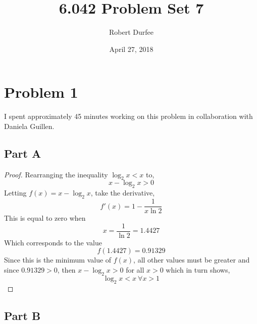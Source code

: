 \documentclass{article}
\title{6.042 Problem Set 7}
\author{Robert Durfee}
\date{April 27, 2018}
\begin{document}
\maketitle

\section*{Problem 1}

I spent approximately 45 minutes working on this problem in collaboration with
Daniela Guillen.

\subsection*{Part A}

\begin{proof}
  Rearranging the inequality $\log_2 x < x$ to,
  $$ x - \log_2 x > 0 $$
  Letting $f(x) = x - \log_2 x$, take the derivative,
  $$ f'(x) = 1 - \frac{1}{x \ln 2} $$
  This is equal to zero when
  $$ x = \frac{1}{\ln 2} = 1.4427 $$
  Which corresponds to the value
  $$ f(1.4427) = 0.91329 $$
  Since this is the minimum value of $f(x)$, all other values must be greater
  and since $0.91329 > 0$, then $x - \log_2 x > 0$ for all $x > 0$ which in turn
  shows, $$ \log_2 x < x\ \forall x > 1 $$
\end{proof}

\break

\subsection*{Part B}
\end{document}
